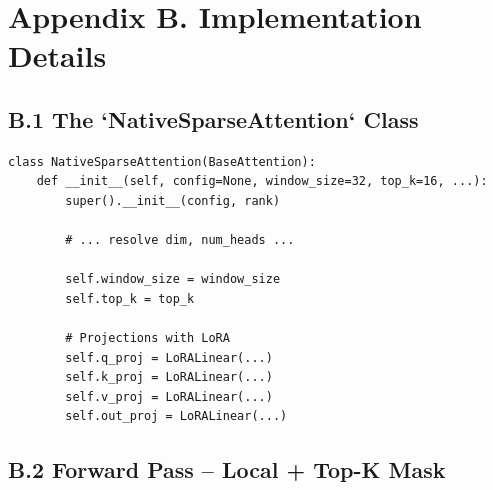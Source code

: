 \section{Appendix B. Implementation Details}

\subsection{B.1 The `NativeSparseAttention` Class}

\begin{lstlisting}
class NativeSparseAttention(BaseAttention):
    def __init__(self, config=None, window_size=32, top_k=16, ...):
        super().__init__(config, rank)
        
        # ... resolve dim, num_heads ...
        
        self.window_size = window_size
        self.top_k = top_k
        
        # Projections with LoRA
        self.q_proj = LoRALinear(...)
        self.k_proj = LoRALinear(...)
        self.v_proj = LoRALinear(...)
        self.out_proj = LoRALinear(...)
\end{lstlisting}

\subsection{B.2 Forward Pass -- Local + Top-K Mask}

